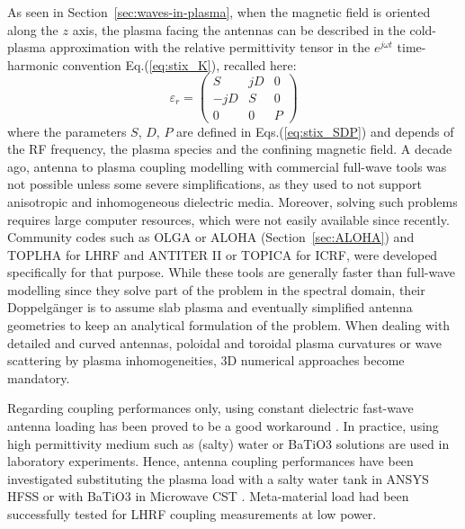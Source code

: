 As seen in Section~\ref{sec:waves-in-plasma}, when the magnetic field is oriented along the $z$ axis, the plasma facing the antennas can be described in the cold-plasma approximation with the relative permittivity tensor in the $e^{j\omega t}$ time-harmonic convention Eq.(\ref{eq:stix_K}), recalled here:
\begin{equation}
\varepsilon_r 
=
\left(
\begin{array}{ccc}
S & jD & 0 \\
-jD & S & 0 \\
0 & 0 & P
\end{array}
\right)
\label{eq:stix_tensor}
\end{equation}
where the parameters $S$, $D$, $P$ are defined in Eqs.(\ref{eq:stix_SDP}) and depends of the RF frequency, the plasma species and the confining magnetic field. 
A decade ago, antenna to plasma coupling modelling with commercial full-wave tools was not possible unless some severe simplifications, as they used to not support anisotropic and inhomogeneous dielectric media. Moreover, solving such problems requires large computer resources, which were not easily available since recently. Community codes such as {OLGA}  or {ALOHA}  (Section~\ref{sec:ALOHA}) and {TOPLHA}  for LHRF and {ANTITER II}  or {TOPICA}  for {ICRF}, were developed specifically for that purpose. While these tools are generally faster than full-wave modelling since they solve part of the problem in the spectral domain, their Doppelgänger is to assume slab plasma and eventually simplified antenna geometries to keep an analytical formulation of the problem. When dealing with detailed and curved antennas, poloidal and toroidal plasma curvatures or wave scattering by plasma inhomogeneities, 3D numerical approaches become mandatory. 

Regarding coupling performances only, using constant dielectric fast-wave antenna loading has been proved to be a good workaround . In practice, using high permittivity medium such as (salty) water or BaTiO3 solutions are used in laboratory experiments. Hence,  antenna coupling performances have been investigated substituting the plasma load  with a salty water tank in ANSYS HFSS  or with BaTiO3 in Microwave CST . Meta-material load had been successfully tested for LHRF coupling measurements at low power. 

